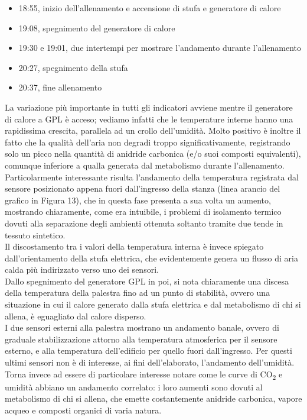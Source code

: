 \documentclass[fleqn,10pt]{SelfArx} %
\begin{document}
\begin{itemize}[noitemsep] %
	\item 18:55, inizio dell'allenamento e accensione di stufa e generatore di calore
	\item 19:08, spegnimento del generatore di calore 
	\item 19:30 e 19:01, due intertempi per mostrare l'andamento durante l'allenamento
	\item 20:27, spegnimento della stufa
	\item 20:37, fine allenamento
\end{itemize}

La variazione più importante in tutti gli indicatori avviene mentre il generatore di calore a GPL è 
acceso; vediamo infatti che le temperature interne hanno una rapidissima crescita, parallela ad un 
crollo dell'umidità. Molto positivo è inoltre il fatto che la qualità dell'aria non degradi troppo 
significativamente, registrando solo un picco nella quantità di anidride carbonica (e/o suoi composti 
equivalenti), comunque inferiore a qualla generata dal metabolismo durante l'allenamento.\\
Particolarmente interessante risulta l'andamento della temperatura registrata dal sensore posizionato 
appena fuori dall'ingresso della stanza (linea arancio del grafico in Figura 13), che in questa fase 
presenta a sua volta un aumento, mostrando chiaramente, come era intuibile, i problemi di isolamento
termico dovuti alla separazione degli ambienti ottenuta soltanto tramite due tende in tessuto sintetico.\\
Il discostamento tra i valori della temperatura interna è invece spiegato dall'orientamento della stufa 
elettrica, che evidentemente genera un flusso di aria calda più indirizzato verso uno dei sensori.\\

Dallo spegnimento del generatore GPL in poi, si nota chiaramente una discesa della temperatura della 
palestra fino ad un punto di stabilità, ovvero una situazione in cui il calore generato dalla stufa 
elettrica e dal metabolismo di chi si allena, è eguagliato dal calore disperso.\\
I due sensori esterni alla palestra mostrano un andamento banale, ovvero di graduale stabilizzazione 
attorno alla temperatura atmosferica per il sensore esterno, e alla temperatura dell'edificio per quello 
fuori dall'ingresso. Per questi ultimi sensori non è di interesse, ai fini dell'elaborato, l'andamento 
dell'umidità.
\\
Torna invece ad essere di particolare interesse notare come le curve di CO\textsubscript{2} e 
umidità abbiano un andamento correlato: i loro aumenti sono dovuti al metabolismo di chi si allena, 
che emette costantemente anidride carbonica, vapore acqueo e composti organici di varia natura.\\
\end{document}
